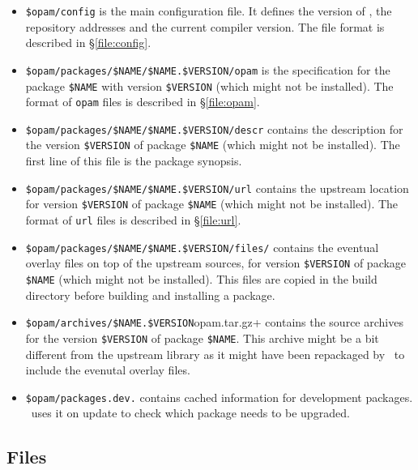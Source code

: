 \documentclass[a4paper,10pt]{article}
\begin{document}
\begin{itemize}

\item {\tt \$opam/config} is the main configuration file. It defines
  the version of \OPAM, the repository addresses and the current compiler
  version. The file format is described in \S\ref{file:config}.

\item \verb+$opam/packages/$NAME/$NAME.$VERSION/opam+ is the
  specification for the package \verb+$NAME+ with version
  \verb+$VERSION+ (which might not be installed). The format of {\tt opam}
  files is described in \S\ref{file:opam}.

\item \verb+$opam/packages/$NAME/$NAME.$VERSION/descr+ contains the
  description for the version \verb+$VERSION+ of package \verb+$NAME+
  (which might not be installed). The first line of this file is the
  package synopsis.

\item \verb+$opam/packages/$NAME/$NAME.$VERSION/url+ contains the
  upstream location for version \verb+$VERSION+ of package \verb+$NAME+
  (which might not be installed). The format of {\tt url} files is
  described in \S\ref{file:url}.

\item \verb+$opam/packages/$NAME/$NAME.$VERSION/files/+ contains the
  eventual overlay files on top of the upstream sources, for version
  \verb+$VERSION+ of package \verb+$NAME+ (which might not be
  installed). This files are copied in the build directory before
  building and installing a package.

\item \verb+$opam/archives/$NAME.$VERSION+opam.tar.gz+ contains the source
  archives for the version \verb+$VERSION+ of package
  \verb+$NAME+. This archive might be a bit different from the
  upstream library as it might have been repackaged by \OPAM\ to include
  the evenutal overlay files.

\item \verb+$opam/packages.dev.+ contains cached information for
  development packages. \OPAM\ uses it on update to check which
  package needs to be upgraded.

\end{itemize}

\subsection{Files}
\end{document}
